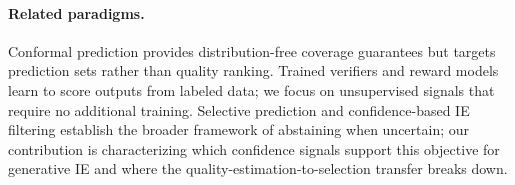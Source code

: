 \paragraph{Related paradigms.}
Conformal prediction \cite{fisch2021conformal, angelopoulos2021conformal} provides distribution-free coverage guarantees but targets prediction sets rather than quality ranking.
Trained verifiers \cite{cobbe2021verifiers, lightman2024verify} and reward models \cite{wang2024mathshepherd} learn to score outputs from labeled data; we focus on unsupervised signals that require no additional training.
Selective prediction \cite{geifman2017selective} and confidence-based IE filtering \cite{culotta2004confidence} establish the broader framework of abstaining when uncertain; our contribution is characterizing which confidence signals support this objective for generative IE and where the quality-estimation-to-selection transfer breaks down.
